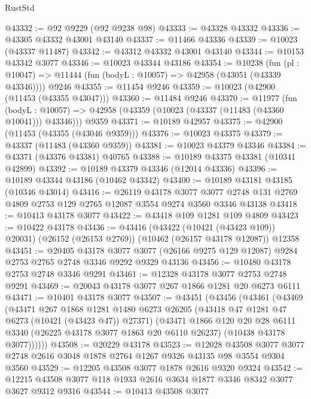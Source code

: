 \begin{lexlean}{RustStd}
\begin{coremodule}
@43332 := @92 @9229 (@92 @9238 @98)
@43333 := @43328 @43332
@43336 := @43305 @43332 @43001 @43140
@43337 := @11466 @43336
@43339 := @10023 (@43337 @11487)
@43342 := @43312 @43332 @43001 @43140
@43344 := @10153 @43342 @3077
@43346 := @10023 @43344 @43186
@43354 := @10238
    (fun (pl : @10047) => @11444 (fun (bodyL : @10057) => @42958 (@43051 (@43339 @43346))))
    @9246
@43355 := @11454 @9246
@43359 := @10023 (@42900 (@11453 (@43355 @43047)))
@43360 := @11484 @9246
@43370 := @11977
    (fun (bodyL : @10057) => @42958 (@43359 (@10023 (@43337 (@11483 (@43360 @10041))) @43346)))
    @9359
@43371 := @10189 @42957
@43375 := @42900 (@11453 (@43355 (@43046 @9359)))
@43376 := @10023 @43375
@43379 := @43337 (@11483 (@43360 @9359))
@43381 := @10023 @43379 @43346
@43384 := @43371 (@43376 @43381) @40765
@43388 := @10189 @43375 @43381 (@10341 @42899)
@43392 := @10189 @43379 @43346 (@12014 @43336)
@43396 := @10189 @43344 @43186 (@10462 @43342)
@43400 := @10189 @43181 @43185 (@10346 @43014)
@43416 := @26119
    @43178
    @3077
    @3077
    @2748
    @131
    @2769
    @4809
    @2753
    @129
    @2765
    @12087
    @3554
    @9274
    @3560
    @3346
    @43138
@43418 := @10413 @43178 @3077
@43422 := @43418 @109 @1281 @109 @4809
@43423 := @10422 @43178
@43436 := @43416
    (@43422 (@10421 (@43423 @109)) @20031)
    (@26152 (@26153 @2769))
    (@10462 (@26157 @43178 @12087))
    @12358
@43451 := @20405
    @43178
    @3077
    @3077
    (@26166 @9275 @129 @12087)
    @9284
    @2753
    @2765
    @2748
    @3346
    @9292
    @9329
    @43136
@43456 := @10480 @43178 @2753 @2748 @3346 @9291
@43461 := @12328 @43178 @3077 @2753 @2748 @9291
@43469 := @20043 @43178 @3077 @267 @1866 @1281 @20 @6273 @6111
@43471 := @10401 @43178 @3077
@43507 := @43451
    (@43456
      (@43461
        (@43469
          (@43471
            @267
            @1868
            @1281
            @1480
            @6273
            @26205
            (@43418 @47 @1281 @47 @6273 (@10421 (@43423 @47)) @27371)
            (@43471
              @1866
              @120
              @20
              @28
              @6111
              @3340
              (@26225 @43178 @3077 @1863 @20 @6110 @26237)
              (@10438 @43178 @3077))))))
@43508 := @20229 @43178
@43523 := @12028
    @43508
    @3077
    @3077
    @2748
    @2616
    @3048
    @1878
    @2764
    @1267
    @9326
    @43135
    @98
    @3554
    @9304
    @3560
@43529 := @12205 @43508 @3077 @1878 @2616 @9320 @9324
@43542 := @12215 @43508 @3077 @118 @1933 @2616 @3634 @1877 @3346 @8342 @3077 @3627 @9312 @9316
@43544 := @10413 @43508 @3077

\end{coremodule}
\end{lexlean}
